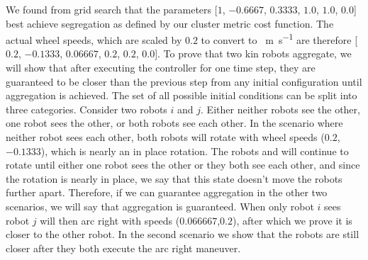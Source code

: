 \documentclass[conference]{IEEEtran}
\begin{document}
    We found from grid search that the parameters [$1$, $-0.6667$, $0.3333$, $1.0$, $1.0$, $0.0$] best achieve segregation as defined by our cluster metric cost function. The actual wheel speeds, which are scaled by $0.2$ to convert to \SI{}{\meter\per\second} are therefore [$0.2$, $-0.1333$, $0.06667$, $0.2$, $0.2$, $0.0$]. To prove that two kin robots aggregate, we will show that after executing the controller for one time step, they are guaranteed to be closer than the previous step from any initial configuration until aggregation is achieved. The set of all possible initial conditions can be split into three categories. Consider two robots $i$ and $j$. Either neither robots see the other, one robot sees the other, or both robots see each other. In the scenario where neither robot sees each other, both robots will rotate with wheel speeds ($0.2$,$-0.1333$), which is nearly an in place rotation. The robots and will continue to rotate until either one robot sees the other or they both see each other, and since the rotation is nearly in place, we say that this state doesn't move the robots further apart. Therefore, if we can guarantee aggregation in the other two scenarios, we will say that aggregation is guaranteed. When only robot $i$ sees robot $j$ will then arc right with speeds ($0.066667$,$0.2$), after which we prove it is closer to the other robot. In the second scenario we show that the robots are still closer after they both execute the arc right maneuver.
\end{document}

